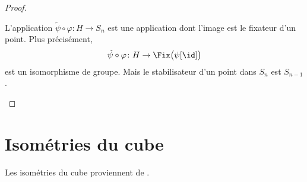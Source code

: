 \begin{proof}
\begin{subproof}
\begin{subproof}
			\spitem[Conclusion]

			L'application \( \tilde \psi\circ\varphi\colon H\to S_n\) est une application dont l'image est le fixateur d'un point. Plus précisément,
			\begin{equation}
				\tilde \psi\circ\varphi\colon H\to \Fix\big( \psi[\id] \big)
			\end{equation}
			est un isomorphisme de groupe. Mais le stabilisateur d'un point dans \( S_n\) est \( S_{n-1}\).
		\end{subproof}
	\end{subproof}
\end{proof}


\section{Isométries du cube}
\label{SecPVCmkxM}
Les isométries du cube proviennent de \cite{KXjFWKA}.

